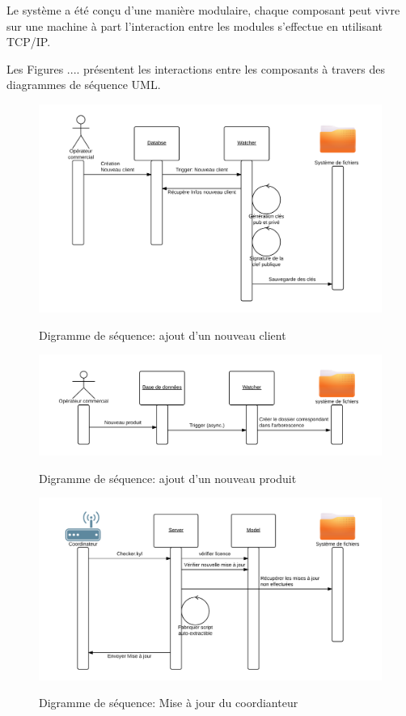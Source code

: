 \documentclass{themeensg}
\begin{document}
Le système a été conçu d'une manière modulaire, chaque composant peut vivre sur une machine à part l’interaction entre les modules s'effectue en utilisant TCP/IP.

Les Figures .... présentent les interactions entre les composants à travers des diagrammes de séquence UML.

\begin{figure}
\centering
\includegraphics[scale=0.8]{images/new_client.png}
\label{fig:new_client}
\caption{Digramme de séquence: ajout d'un nouveau client}
\end{figure}

\begin{figure}
\centering
\includegraphics[scale=0.8]{images/new_product.png}
\label{fig:new_product}
\caption{Digramme de séquence: ajout d'un nouveau produit}
\end{figure}

\begin{figure}
\centering\includegraphics[scale=0.8]{images/maj.png}
\label{fig:maj}
\caption{Digramme de séquence: Mise à jour du coordianteur}
\end{figure}
\end{document}
